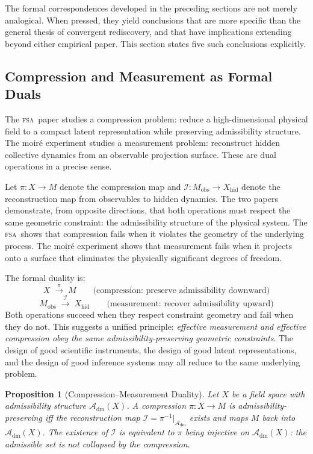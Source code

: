 \documentclass[11pt,a4paper]{article}
\theoremstyle{plain}
\newtheorem{proposition}[theorem]{Proposition}
\theoremstyle{definition}
\theoremstyle{remark}
\newcommand{\Adm}{\mathcal{A}_{\mathrm{dm}}}
\newcommand{\FSA}{\textup{\textsc{fsa}}}
\begin{document}
The formal correspondences developed in the preceding sections are not
merely analogical. When pressed, they yield conclusions that are more
specific than the general thesis of convergent rediscovery, and that have
implications extending beyond either empirical paper. This section states
five such conclusions explicitly.

\subsection{Compression and Measurement as Formal Duals}

The \FSA\ paper studies a compression problem: reduce a high-dimensional
physical field to a compact latent representation while preserving
admissibility structure. The moiré experiment studies a measurement
problem: reconstruct hidden collective dynamics from an observable
projection surface. These are dual operations in a precise sense.

Let $\pi: X \to M$ denote the compression map and
$\mathcal{I}: M_{\mathrm{obs}} \to X_{\mathrm{hid}}$ denote the
reconstruction map from observables to hidden dynamics. The two papers
demonstrate, from opposite directions, that both operations must respect
the same geometric constraint: the admissibility structure of the physical
system. The \FSA\ shows that compression fails when it violates the
geometry of the underlying process. The moiré experiment shows that
measurement fails when it projects onto a surface that eliminates the
physically significant degrees of freedom.

The formal duality is:
\[
X \;\xrightarrow{\;\pi\;}\; M
\qquad\text{(compression: preserve admissibility downward)}
\]
\[
M_{\mathrm{obs}} \;\xrightarrow{\;\mathcal{I}\;}\; X_{\mathrm{hid}}
\qquad\text{(measurement: recover admissibility upward)}
\]
Both operations succeed when they respect constraint geometry and fail
when they do not. This suggests a unified principle: \textit{effective
measurement and effective compression obey the same admissibility-preserving
geometric constraints}. The design of good scientific instruments, the
design of good latent representations, and the design of good inference
systems may all reduce to the same underlying problem.

\begin{proposition}[Compression--Measurement Duality]
Let $X$ be a field space with admissibility structure $\Adm(X)$. A
compression $\pi: X \to M$ is admissibility-preserving iff the
reconstruction map $\mathcal{I} = \pi^{-1}|_{\Adm}$ exists and maps
$M$ back into $\Adm(X)$. The existence of $\mathcal{I}$ is equivalent
to $\pi$ being injective on $\Adm(X)$: the admissible set is not
collapsed by the compression.
\end{proposition}
\end{document}
